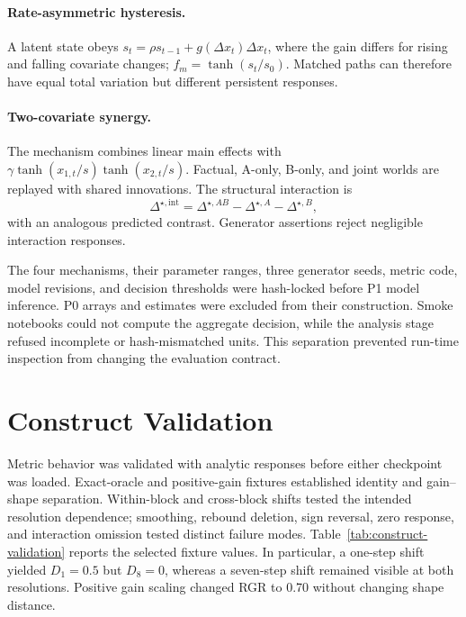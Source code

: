 \documentclass[conference]{IEEEtran}
\begin{document}
\paragraph{Rate-asymmetric hysteresis.}
A latent state obeys
$s_t=\rho s_{t-1}+g(\Delta x_t)\Delta x_t$, where the gain differs for rising and
falling covariate changes; $f_m=\tanh(s_t/s_0)$. Matched paths can therefore have equal
total variation but different persistent responses.

\paragraph{Two-covariate synergy.}
The mechanism combines linear main effects with
$\gamma\tanh(x_{1,t}/s)\tanh(x_{2,t}/s)$. Factual, A-only, B-only, and joint worlds are
replayed with shared innovations. The structural interaction is
\begin{equation}
\Delta^{\star,\mathrm{int}}=\Delta^{\star,AB}-
\Delta^{\star,A}-\Delta^{\star,B},
\end{equation}
with an analogous predicted contrast. Generator assertions reject negligible
interaction responses.

The four mechanisms, their parameter ranges, three generator seeds, metric code, model
revisions, and decision thresholds were hash-locked before P1 model inference. P0
arrays and estimates were excluded from their construction. Smoke notebooks could not
compute the aggregate decision, while the analysis stage refused incomplete or
hash-mismatched units. This separation prevented run-time inspection from changing the
evaluation contract.

\section{Construct Validation}
Metric behavior was validated with analytic responses before either checkpoint was
loaded. Exact-oracle and positive-gain fixtures established identity and gain--shape
separation. Within-block and cross-block shifts tested the intended resolution
dependence; smoothing, rebound deletion, sign reversal, zero response, and interaction
omission tested distinct failure modes. Table~\ref{tab:construct-validation} reports
the selected fixture values. In particular, a one-step shift yielded $D_1=0.5$ but
$D_8=0$, whereas a seven-step shift remained visible at both resolutions. Positive
gain scaling changed RGR to 0.70 without changing shape distance.


\end{document}

